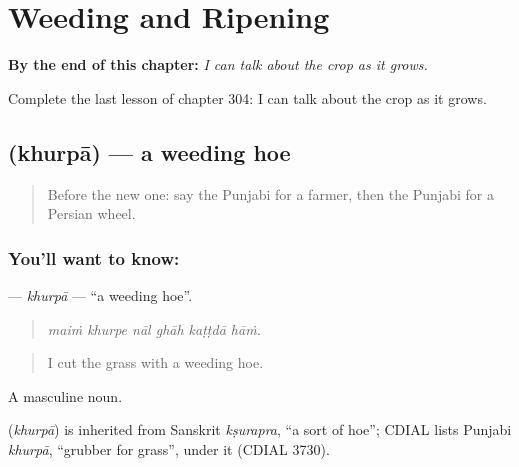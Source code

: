 
\chapter{Weeding and Ripening}
\label{ch:pa-a2-weeding-and-ripening}

\begin{chapteropening}
\textbf{By the end of this chapter:} \emph{I can talk about the crop as it grows.}

Complete the last lesson of chapter 304: I can talk about the crop as it grows.
\end{chapteropening}

\section[\texorpdfstring{\pa{ਖੁਰਪਾ} (khurpā)}{ਖੁਰਪਾ (khurpā)}]{ (khurpā) — a weeding hoe}

\label{lesson:PA-C304-khurpa}



\begin{quote}
Before the new one: say the Punjabi for a farmer, then the Punjabi for a Persian wheel.
\end{quote}

\subsection*{You'll want to know: }
\textbf{} — \emph{khurpā} — \textquotedblleft{}a weeding hoe\textquotedblright{}.

\begin{quote}
     
\end{quote}

\begin{quote}
\emph{maiṁ khurpe nāl ghāh kaṭṭdā hāṁ.}
\end{quote}

\begin{quote}
I cut the grass with a weeding hoe.
\end{quote}

A masculine noun.

\begin{cousinweb}
\textbf{} (\emph{khurpā}) is inherited from Sanskrit \emph{kṣurapra}, \textquotedblleft{}a sort of hoe\textquotedblright{}; CDIAL lists Punjabi \emph{khurpā}, \textquotedblleft{}grubber for grass\textquotedblright{}, under it (CDIAL 3730).
\end{cousinweb}

